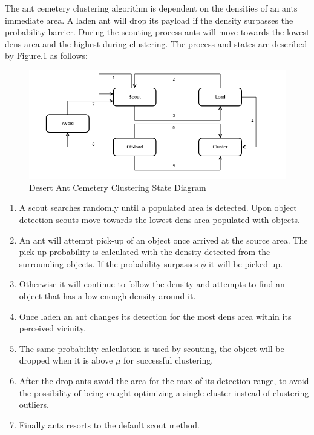 \documentclass[12pt]{article}
\begin{document}
\par{The ant cemetery clustering algorithm is dependent on the densities of an ants immediate area. A laden ant will  drop its payload if the density surpasses the probability barrier. During the scouting process ants will move towards the lowest dens area and the highest during clustering. The process and states are described by Figure.1 as follows:}
\\
\begin{figure}[h]
\includegraphics[width=\textwidth]{desertant.png}
\centering
\caption{Desert Ant Cemetery Clustering State Diagram}
\label{fig:desertamtState}
\end{figure}

\begin{enumerate}[nolistsep]
\item A scout searches randomly until a populated area is detected. Upon object detection scouts move towards the lowest dens area populated with objects.
\item An ant will attempt pick-up of an object once arrived at the source area. The pick-up probability is calculated with the density detected from the surrounding objects. If the probability surpasses $\phi$ it will be picked up.
\item Otherwise it will continue to follow the density and attempts to find an object that has a low enough density around it.
\item Once laden an ant changes its detection for the most dens area within its perceived vicinity.
\item The same probability calculation is used by scouting, the object will be dropped when it is above $\mu$ for successful clustering.
\item After the drop ants avoid the area for the max of its detection range, to avoid the possibility of being caught optimizing a single cluster instead of clustering outliers.
\item Finally ants resorts to the default scout method.
\end{enumerate}
\end{document}
